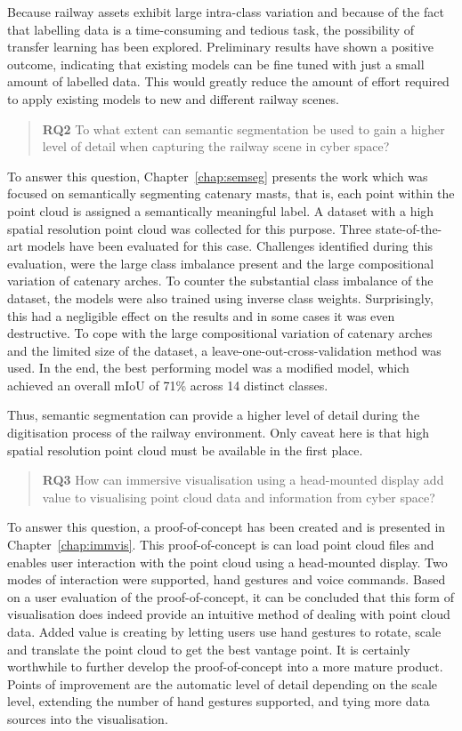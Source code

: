 Because railway assets exhibit large intra-class variation and because of the fact that labelling data is a time-consuming and tedious task, the possibility of transfer learning has been explored. Preliminary results have shown a positive outcome, indicating that existing models can be fine tuned with just a small amount of labelled data. This would greatly reduce the amount of effort required to apply existing models to new and different railway scenes.

\begin{quote}
    \textbf{RQ2} To what extent can semantic segmentation be used to gain a higher level of detail when capturing the railway scene in cyber space?
\end{quote}
To answer this question, Chapter~\ref{chap:semseg} presents the work which was focused on semantically segmenting catenary masts, that is, each point within the point cloud is assigned a semantically meaningful label. A dataset with a high spatial resolution point cloud was collected for this purpose. Three state-of-the-art models have been evaluated for this case. Challenges identified during this evaluation, were the large class imbalance present and the large compositional variation of catenary arches. To counter the substantial class imbalance of the dataset, the models were also trained using inverse class weights. Surprisingly, this had a negligible effect on the results and in some cases it was even destructive. To cope with the large compositional variation of catenary arches and the limited size of the dataset, a leave-one-out-cross-validation method was used. In the end, the best performing model was a modified \pnpp{} model, which achieved an overall mIoU of 71\% across 14 distinct classes.

Thus, semantic segmentation can provide a higher level of detail during the digitisation process of the railway environment. Only caveat here is that high spatial resolution point cloud must be available in the first place.

\begin{quote}
    \textbf{RQ3} How can immersive visualisation using a head-mounted display add value to visualising point cloud data and information from cyber space?
\end{quote}
To answer this question, a proof-of-concept has been created and is presented in Chapter~\ref{chap:immvis}. This proof-of-concept is can load point cloud files and enables user interaction with the point cloud using a head-mounted display. Two modes of interaction were supported, hand gestures and voice commands. Based on a user evaluation of the proof-of-concept, it can be concluded that this form of visualisation does indeed provide an intuitive method of dealing with point cloud data. Added value is creating by letting users use hand gestures to rotate, scale and translate the point cloud to get the best vantage point. It is certainly worthwhile to further develop the proof-of-concept into a more mature product. Points of improvement are the automatic level of detail depending on the scale level, extending the number of hand gestures supported, and tying more data sources into the visualisation.

